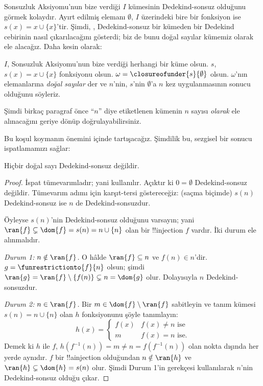 \documentclass[../../../include/open-logic-section]{subfiles}
\begin{document}
Sonsuzluk Aksiyomu'nun bize verdiği $I$ kümesinin Dedekind-sonsuz olduğunu
görmek kolaydır. Ayırt edilmiş elemanı $\emptyset$, $I$ üzerindeki bire bir
fonksiyon ise $s(x)=x\cup\{x\}$'tir. Şimdi,
,
Dedekind-sonsuz bir kümeden bir Dedekind cebirinin nasıl çıkarılacağını
gösterdi; biz de bunu doğal sayılar kümemiz olarak ele alacağız. Daha kesin
olarak:
\begin{defn}
$I$, Sonsuzluk Aksiyomu'nun bize verdiği herhangi bir küme olsun. $s$,
$s(x)=x\cup\{x\}$ fonksiyonu olsun. $\omega =
\closureofunder{s}{\emptyset}$ olsun. $\omega$'nın elemanlarına
\emph{doğal sayılar} der ve $n$'nin, $s$'nin $\emptyset$'a $n$ kez
uygulanmasının sonucu olduğunu söyleriz.
\end{defn}

Şimdi birkaç paragraf önce ``$n$'' diye etiketlenen kümenin $n$ sayısı
\emph{olarak} ele alınacağını geriye dönüp doğrulayabilirsiniz.

Bu koşul koymanın önemini  içinde tartışacağız.
Şimdilik bu, sezgisel bir sonucu ispatlamamızı sağlar:

\begin{prop}
Hiçbir doğal sayı Dedekind-sonsuz değildir.
\end{prop}

\begin{proof}
İspat tümevarımladır; yani
 kullanılır.
Açıktır ki $0=\emptyset$ Dedekind-sonsuz değildir. Tümevarım adımı için
karşıt-tersi göstereceğiz: (saçma biçimde) $s(n)$ Dedekind-sonsuz ise $n$
de Dedekind-sonsuzdur.

Öyleyse $s(n)$'nin Dedekind-sonsuz olduğunu varsayın; yani
$\ran{f}\subsetneq\dom{f}=s(n)=n\cup\{n\}$ olan bir !!{injection} $f$
vardır. İki durum ele alınmalıdır.

\emph{Durum 1: $n \notin \ran{f}$.} O hâlde $\ran{f}\subseteq n$ ve
$f(n)\in n$'dir. $g=\funrestrictionto{f}{n}$ olsun; şimdi
$\ran{g}=\ran{f}\setminus\{f(n)\}\subsetneq n=\dom{g}$ olur. Dolayısıyla
$n$ Dedekind-sonsuzdur.

\emph{Durum 2: $n \in \ran{f}$.} Bir
$m\in\dom{f}\setminus\ran{f}$ sabitleyin ve tanım kümesi
$s(n)=n\cup\{n\}$ olan $h$ fonksiyonunu şöyle tanımlayın:
\[
h(x) =
	\begin{cases}
		f(x) & \text{$f(x) \neq n$ ise}\\
		m & \text{$f(x)=n$ ise.}
	\end{cases}
\]
Demek ki $h$ ile $f$, $h(f^{-1}(n))=m\neq n=f(f^{-1}(n))$ olan nokta
dışında her yerde aynıdır. $f$ bir !!a{injection} olduğundan
$n\notin\ran{h}$ ve $\ran{h}\subsetneq\dom{h}=s(n)$ olur. Şimdi Durum 1'in
gerekçesi kullanılarak $n$'nin Dedekind-sonsuz olduğu çıkar.
\end{proof}
\end{document}
